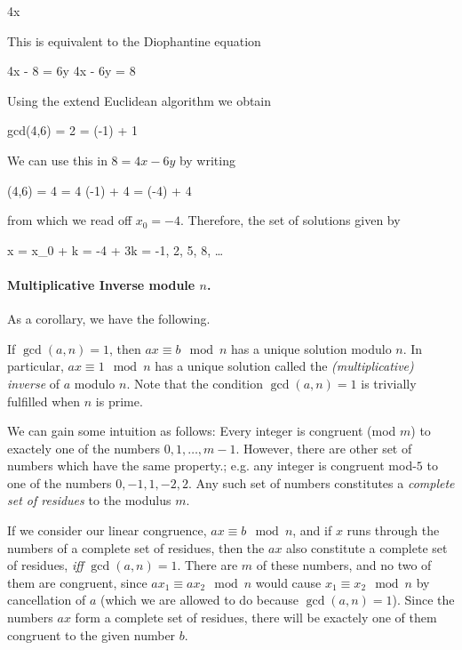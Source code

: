 \bee
4x  
\eee

This is equivalent to the Diophantine equation

\bee
4x - 8 = 6y \rightarrow 4x - 6y = 8
\eee

Using the extend Euclidean algorithm we obtain

\bee
gcd(4,6) = 2 = (-1)  + 1 
\eee

We can use this in $8 = 4x - 6y$ by writing

 \cdot \gcd(4,6) = 4  = 4 \cdot (-1)  + 4   = (-4)  + 4 
\eee

from which we read off $x_0 = -4$. Therefore, the set of solutions given by

\bee
x = x_0 + k  = -4 + 3k = -1, 2, 5, 8, \ldots
\eee

\paragraph{Multiplicative Inverse module $n$.} As a corollary, we have the following.

\begin{theorem}
    If $\gcd(a,n) = 1$, then $a x \equiv b \mod n$ has a unique solution modulo $n$. In particular, $a x \equiv 1 \mod n$ has a unique solution called the \emph{(multiplicative) inverse} of $a$ modulo $n$. Note that the condition $\gcd(a,n) = 1$ is trivially fulfilled when $n$ is prime.
\end{theorem}

We can gain some intuition as follows: Every integer is congruent (mod $m$) to exactely one of the numbers $0,1,\ldots, m-1$. However, there are other set of numbers which have the same property.; e.g. any integer is congruent mod-$5$ to one of the numbers $0,-1,1,-2,2$. Any such set of numbers constitutes a \emph{complete set of residues} to the modulus $m$.

If we consider our linear congruence, $ax \equiv b \mod n$, and if $x$ runs through the numbers of a complete set of residues, then the $ax$ also constitute a complete set of residues, \emph{iff} $\gcd(a,n) = 1$. There are $m$ of these numbers, and no two of them are congruent, since $a x_1 \equiv a x_2 \mod n$ would cause $x_1 \equiv x_2 \mod n$ by cancellation of $a$ (which we are allowed to do because $\gcd(a,n) = 1$). Since the numbers $ax$ form a complete set of residues, there will be exactely one of them congruent to the given number $b$.

